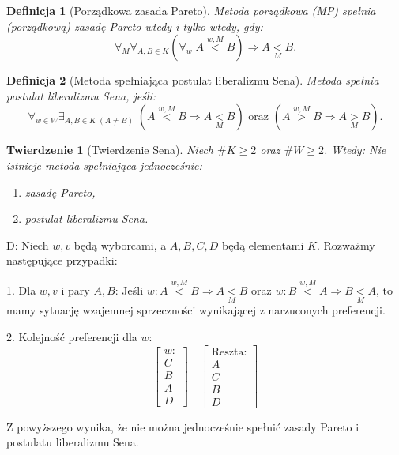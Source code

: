 \documentclass[12pt,a4paper]{article}
\theoremstyle{break}
\newtheorem{definition}{Definicja}[section]
\newtheorem{theorem}{Twierdzenie}[section]
\begin{document}
	\begin{definition}[Porządkowa zasada Pareto]
		Metoda porządkowa (MP) spełnia (porządkową) zasadę Pareto wtedy i tylko wtedy, gdy:
		\[
		\forall_M \forall_{A, B \in K} \left( \forall_w \; A \overset{w, M}{<} B \right) \Rightarrow A \underset{M}{<} B.
		\]
	\end{definition}
	
	\begin{definition}[Metoda spełniająca postulat liberalizmu Sena]
		Metoda spełnia postulat liberalizmu Sena, jeśli:
		\[
		\forall_{w \in W} \exists_{A, B \in K \; (A \neq B)} \; \left( A \overset{w, M}{<} B \Rightarrow A \underset{M}{<} B \right) \text{ oraz } \left( A \overset{w, M}{>} B \Rightarrow A \underset{M}{>} B \right).
		\]
	\end{definition}
	
	\begin{theorem}[Twierdzenie Sena]
		Niech $\# K \geq 2$ oraz $\# W \geq 2$. Wtedy:
		Nie istnieje metoda spełniająca jednocześnie:
		\begin{enumerate}
			\item zasadę Pareto,
			\item postulat liberalizmu Sena.
		\end{enumerate}
	\end{theorem}
	
	D: Niech $w, v$ będą wyborcami, a $A, B, C, D$ będą elementami $K$. Rozważmy następujące przypadki:
		
		1. Dla $w, v$ i pary $A, B$:  
		Jeśli $w : A \overset{w, M}{<} B \Rightarrow A \underset{M}{<} B$ oraz $w : B \overset{w, M}{<} A \Rightarrow B \underset{M}{<} A$, to mamy sytuację wzajemnej sprzeczności wynikającej z narzuconych preferencji.
		
		2. Kolejność preferencji dla $w$:
		\[
		\begin{bmatrix}
			w:\\
			C\\
			B\\
			A\\
			D
		\end{bmatrix}
		\quad
		\begin{bmatrix}
			\text{Reszta:}\\
			A\\
			C\\
			B\\
			D
		\end{bmatrix}
		\]
		
		Z powyższego wynika, że nie można jednocześnie spełnić zasady Pareto i postulatu liberalizmu Sena. 
	
\end{document}
